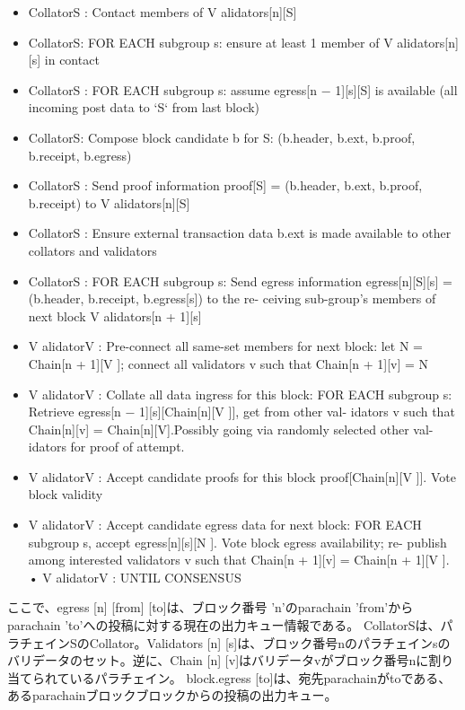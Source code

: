 \begin{itemize}
\tightlist
\item
  CollatorS : Contact members of V alidators{[}n{]}{[}S{]}
\item
  CollatorS: FOR EACH subgroup s: ensure at least 1 member of V
  alidators{[}n{]}{[}s{]} in contact
\item
  CollatorS : FOR EACH subgroup s: assume egress{[}n −
  1{]}{[}s{]}{[}S{]} is available (all incoming post data to `S` from
  last block)
\item
  CollatorS: Compose block candidate b for S: (b.header, b.ext, b.proof,
  b.receipt, b.egress)
\item
  CollatorS : Send proof information proof{[}S{]} = (b.header, b.ext,
  b.proof, b.receipt) to V alidators{[}n{]}{[}S{]}
\item
  CollatorS : Ensure external transaction data b.ext is made available
  to other collators and validators
\item
  CollatorS : FOR EACH subgroup s: Send egress information
  egress{[}n{]}{[}S{]}{[}s{]} = (b.header, b.receipt, b.egress{[}s{]})
  to the re- ceiving sub-group's members of next block V alidators{[}n +
  1{]}{[}s{]}
\item
  V alidatorV : Pre-connect all same-set members for next block: let N =
  Chain{[}n + 1{]}{[}V {]}; connect all validators v such that Chain{[}n
  + 1{]}{[}v{]} = N
\item
  V alidatorV : Collate all data ingress for this block: FOR EACH
  subgroup s: Retrieve egress{[}n − 1{]}{[}s{]}{[}Chain{[}n{]}{[}V
  {]}{]}, get from other val- idators v such that Chain{[}n{]}{[}v{]} =
  Chain{[}n{]}{[}V{]}.Possibly going via randomly selected other val-
  idators for proof of attempt.
\item
  V alidatorV : Accept candidate proofs for this block
  proof{[}Chain{[}n{]}{[}V {]}{]}. Vote block validity
\item
  V alidatorV : Accept candidate egress data for next block: FOR EACH
  subgroup s, accept egress{[}n{]}{[}s{]}{[}N {]}. Vote block egress
  availability; re- publish among interested validators v such that
  Chain{[}n + 1{]}{[}v{]} = Chain{[}n + 1{]}{[}V {]}. • V alidatorV :
  UNTIL CONSENSUS
\end{itemize}

ここで、egress {[}n{]} {[}from{]} {[}to{]}は、ブロック番号
'n'のparachain 'from'からparachain
'to'への投稿に対する現在の出力キュー情報である。
Collat​​orSは、パラチェインSのCollator。Validators {[}n{]}
{[}s{]}は、ブロック番号nのパラチェインsのバリデータのセット。逆に、Chain
{[}n{]}
{[}v{]}はバリデータvがブロック番号nに割り当てられているパラチェイン。
block.egress
{[}to{]}は、宛先parachainがtoである、あるparachainブロックブロックからの投稿の出力キュー。

